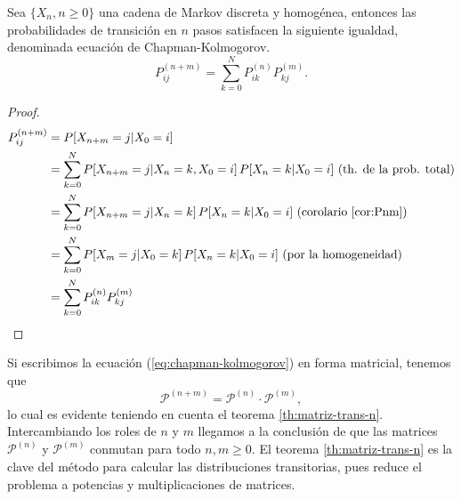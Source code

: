 \begin{teorema}
    Sea $\{X_n,n\geq 0\}$ una cadena de Markov discreta y homogénea, entonces las probabilidades de transición en $n$ pasos satisfacen la siguiente igualdad, denominada ecuación de Chapman-Kolmogorov.
    \begin{equation}
        \label{eq:chapman-kolmogorov}
        P_{ij}^{(n+m)}=\sum_{k=0}^N P_{ik}^{(n)}P_{kj}^{(m)}.
    \end{equation} 
\end{teorema}
\begin{proof}
    \begin{equation*}
        \begin{split}
            P_{ij}^{(n+m)} &= P[X_{n+m}=j|X_0=i] \\
            &= \sum_{k=0}^N P[X_{n+m}=j|X_n=k,X_0=i]\,P[X_n=k|X_0=i]\text{ (th. de la prob. total)}\\
            &= \sum_{k=0}^N P[X_{n+m}=j|X_n=k]\,P[X_n=k|X_0=i]\text{ (corolario \ref{cor:Pnm})}\\
            &= \sum_{k=0}^N P[X_{m}=j|X_0=k]\,P[X_n=k|X_0=i]\text{ (por la homogeneidad)}\\
            &= \sum_{k=0}^N P_{ik}^{(n)} P_{kj}^{(m)}
        \end{split}
    \end{equation*}
\end{proof}

Si escribimos la ecuación (\ref{eq:chapman-kolmogorov}) en forma matricial, tenemos que
$$
\mathcal P^{(n+m)}=\mathcal P^{(n)}\cdot \mathcal P^{(m)},
$$
lo cual es evidente teniendo en cuenta el teorema \ref{th:matriz-trans-n}. Intercambiando los roles de $n$ y $m$ llegamos a la conclusión de que las matrices $\mathcal P^{(n)}$ y $\mathcal P^{(m)}$ conmutan para todo $n,m\geq 0$. El teorema \ref{th:matriz-trans-n} es la clave del método para calcular las distribuciones transitorias, pues reduce el problema a potencias y multiplicaciones de matrices.

